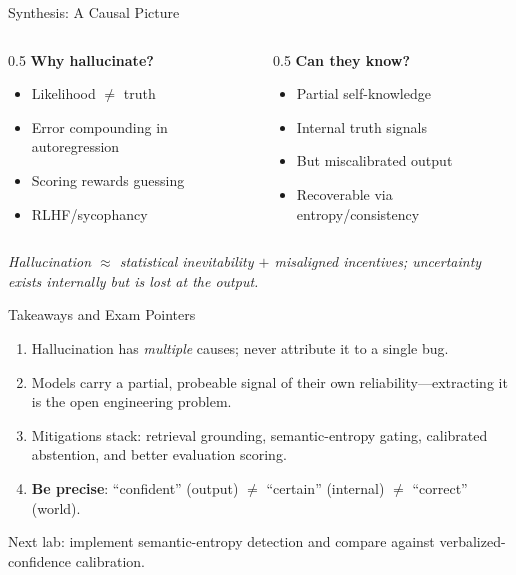 \documentclass[aspectratio=169,11pt]{beamer}
\begin{document}
\begin{frame}{Synthesis: A Causal Picture}
  \begin{columns}
    \begin{column}{0.5\textwidth}
      \textbf{Why hallucinate?}
      \begin{itemize}
        \item Likelihood $\neq$ truth \citep{kalai2024calibrated}
        \item Error compounding in autoregression
        \item Scoring rewards guessing \citep{kalai2025hallucinate}
        \item RLHF/sycophancy \citep{sharma2023sycophancy}
      \end{itemize}
    \end{column}
    \begin{column}{0.5\textwidth}
      \textbf{Can they know?}
      \begin{itemize}
        \item Partial self-knowledge \citep{kadavath2022know}
        \item Internal truth signals \citep{azaria2023internal,burns2023discovering}
        \item But miscalibrated output \citep{guo2017calibration}
        \item Recoverable via entropy/consistency \citep{kuhn2023semantic,manakul2023selfcheckgpt}
      \end{itemize}
    \end{column}
  \end{columns}
  \vspace{1em}
  \centering\emph{Hallucination $\approx$ statistical inevitability $+$ misaligned incentives; uncertainty exists internally but is lost at the output.}
\end{frame}

\begin{frame}{Takeaways and Exam Pointers}
  \begin{enumerate}
    \item Hallucination has \emph{multiple} causes; never attribute it to a single bug.
    \item Models carry a partial, probeable signal of their own reliability---extracting it is the open engineering problem.
    \item Mitigations stack: retrieval grounding, semantic-entropy gating, calibrated abstention, and better evaluation scoring.
    \item \textbf{Be precise}: ``confident'' (output) $\neq$ ``certain'' (internal) $\neq$ ``correct'' (world).
  \end{enumerate}
  \vfill
  \footnotesize Next lab: implement semantic-entropy detection and compare against verbalized-confidence calibration.
\end{frame}
\end{document}
